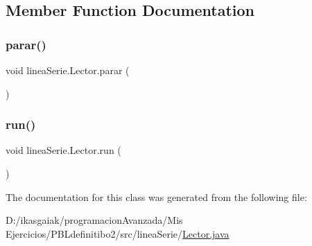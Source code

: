 \subsection{Member Function Documentation}
\mbox{\label{classlinea_serie_1_1_lector_a509803a17c2a813a3b9b81379697cfb0}} 
\subsubsection{\texorpdfstring{parar()}{parar()}}
{\footnotesize\ttfamily void linea\+Serie.\+Lector.\+parar (\begin{DoxyParamCaption}{ }\end{DoxyParamCaption})}

\mbox{\label{classlinea_serie_1_1_lector_abae20cd464d8a754ae303c0465edc283}} 
\subsubsection{\texorpdfstring{run()}{run()}}
{\footnotesize\ttfamily void linea\+Serie.\+Lector.\+run (\begin{DoxyParamCaption}{ }\end{DoxyParamCaption})}



The documentation for this class was generated from the following file\+:\begin{DoxyCompactItemize}
\item 
D\+:/ikasgaiak/programacion\+Avanzada/\+Mis Ejercicios/\+P\+B\+Ldefinitibo2/src/linea\+Serie/\mbox{\hyperlink{_lector_8java}{Lector.\+java}}\end{DoxyCompactItemize}
